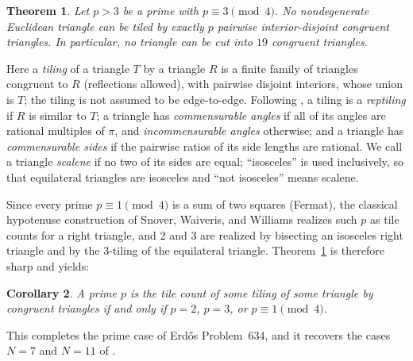 \documentclass[11pt]{amsart}
\newtheorem{theorem}{Theorem}
\newtheorem{corollary}[theorem]{Corollary}
\theoremstyle{remark}
\begin{document}
\begin{theorem}\label{thm:main}
Let $p>3$ be a prime with $p\equiv 3\pmod 4$. No nondegenerate Euclidean triangle can be tiled by exactly $p$ pairwise interior-disjoint congruent triangles. In particular, no triangle can be cut into $19$ congruent triangles.
\end{theorem}

Here a \emph{tiling} of a triangle $T$ by a triangle $R$ is a finite family of triangles congruent to $R$ (reflections allowed), with pairwise disjoint interiors, whose union is $T$; the tiling is not assumed to be edge-to-edge. Following \cite{BLZ633}, a tiling is a \emph{reptiling} if $R$ is similar to $T$; a triangle has \emph{commensurable angles} if all of its angles are rational multiples of $\pi$, and \emph{incommensurable angles} otherwise; and a triangle has \emph{commensurable sides} if the pairwise ratios of its side lengths are rational. We call a triangle \emph{scalene} if no two of its sides are equal; ``isosceles'' is used inclusively, so that equilateral triangles are isosceles and ``not isosceles'' means scalene.

Since every prime $p\equiv 1\pmod 4$ is a sum of two squares (Fermat), the classical hypotenuse construction of Snover, Waiveris, and Williams \cite{SWW91} realizes such $p$ as tile counts for a right triangle, and $2$ and $3$ are realized by bisecting an isosceles right triangle and by the $3$-tiling of the equilateral triangle. Theorem~\ref{thm:main} is therefore sharp and yields:

\begin{corollary}\label{cor:primes}
A prime $p$ is the tile count of some tiling of some triangle by congruent triangles if and only if $p=2$, $p=3$, or $p\equiv 1\pmod 4$.
\end{corollary}

This completes the prime case of Erd\H{o}s Problem~634, and it recovers the cases $N=7$ and $N=11$ of \cite{Beeson7}.
\end{document}
